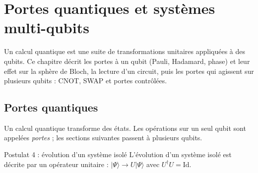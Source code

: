 
\providecommand{\ket}[1]{|#1\rangle}
\providecommand{\bra}[1]{\langle #1|}
\providecommand{\braket}[2]{\langle #1|#2\rangle}

\section{Portes quantiques et systèmes multi-qubits}\label{chap:portes}

Un calcul quantique est une suite de transformations unitaires appliquées à des qubits. Ce
chapitre décrit les portes à un qubit (Pauli, Hadamard, phase) et leur effet sur la sphère de
Bloch, la lecture d'un circuit, puis les portes qui agissent sur plusieurs qubits : CNOT, SWAP et
portes contrôlées.

\subsection{Portes quantiques}\label{sec:portes}

Un calcul quantique transforme des états. Les opérations sur un seul qubit sont appelées
\emph{portes} ; les sections suivantes passent à plusieurs qubits.

\begin{resultat}{Postulat 4 : évolution d'un système isolé}
L'évolution d'un système isolé est décrite par un opérateur unitaire : $\ket{\Psi}\to U\ket{\Psi}$
avec $U^\dagger U=\mathrm{Id}$.
\end{resultat}

